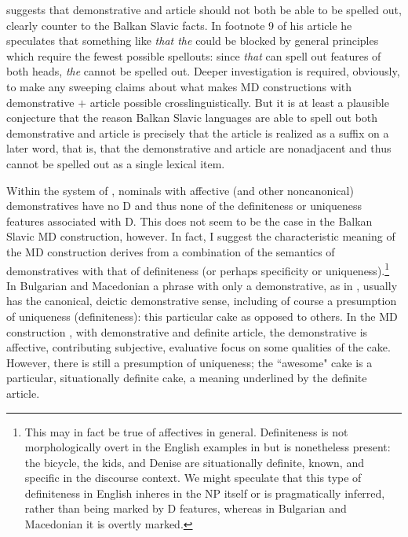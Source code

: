\documentclass[output=paper,
colorlinks,
citecolor=brown,
newtxmath
]{langscibook}
\begin{document}
\cite{Simik2016} suggests that demonstrative and article should not both be able to be spelled out, clearly counter to the Balkan Slavic facts. In footnote 9 of his article he speculates that something like \textit{that the} could be blocked by general principles which require the fewest possible spellouts: since \textit{that} can spell out features of both heads, \textit{the} cannot be spelled out. Deeper investigation is required, obviously, to make any sweeping claims about what makes MD constructions with demonstrative $+$ article possible crosslinguistically. But it is at least a plausible conjecture that the reason Balkan Slavic languages are able to spell out both demonstrative and article is precisely that the article is realized as a suffix on a later word, that is, that the demonstrative and article are nonadjacent and thus cannot be spelled out as a single lexical item.

Within the system of \cite{Simik2016}, nominals with affective (and other noncanonical) demonstratives have no D and thus none of the definiteness or uniqueness features associated with D. This does not seem to be the case in the Balkan Slavic MD construction, however. In fact, I suggest the characteristic meaning of the MD construction derives from a combination of the semantics of demonstratives with that of definiteness (or perhaps specificity or uniqueness).\footnote{This may in fact be true  of affectives in general. Definiteness is not morphologically overt in the English examples in  but is nonetheless present: the bicycle, the kids, and Denise are situationally definite, known, and specific in the discourse context. We might speculate that this type of definiteness in English inheres in the NP itself or is pragmatically inferred, rather than being marked by D features, whereas in Bulgarian and Macedonian it is overtly marked.} In Bulgarian and Macedonian a phrase with only a demonstrative, as in , usually has the canonical, deictic demonstrative sense, including of course a presumption of uniqueness (definiteness): this particular cake as opposed to others. In the MD construction , with demonstrative and definite article, the demonstrative is affective, contributing subjective, evaluative focus on some qualities of the cake. However, there is still a presumption of uniqueness; the ``awesome" cake is a particular, situationally definite cake, a meaning underlined by the definite article.
\end{document}
